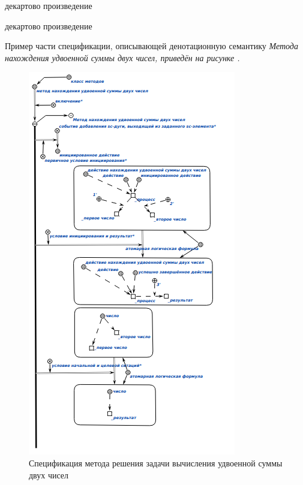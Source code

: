\begin{SCn}
\begin{scnindent}
\end{scnindent}
\begin{scnindent}
    \begin{scnreltovector}{декартово произведение}
    \end{scnreltovector}
\end{scnindent}
\begin{scnindent}
    \begin{scnreltovector}{декартово произведение}
    \end{scnreltovector}
\end{scnindent}
\end{SCn}

Пример части спецификации, описывающей денотационную семантику \textit{Метода нахождения удвоенной суммы двух чисел, приведён на рисунке .
}
\begin{figure}[htbp]
  \center
  \includegraphics[scale=0.7]{author/part3/figures/condition_and_result.png}
  \caption{Спецификация метода решения задачи вычисления удвоенной суммы двух чисел}
  \label{fig:condition_and_result}
\end{figure}

